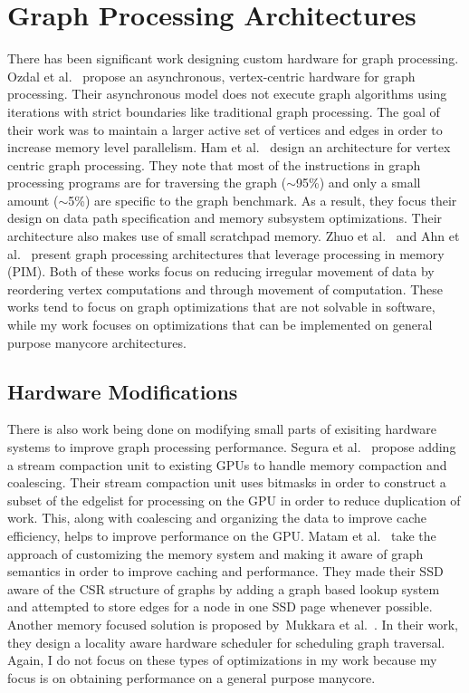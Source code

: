 \section{Graph Processing Architectures} There has been significant work designing custom hardware for graph processing.
Ozdal et al.~\cite{ozdal2016energy} propose an asynchronous, vertex-centric hardware for graph processing. 
Their asynchronous model does not execute graph algorithms using iterations with strict boundaries like traditional graph processing. 
The goal of their work was to maintain a larger active set of vertices and edges in order to increase memory level parallelism. 
Ham et al.~\cite{ham2016graphicionado} design an architecture for vertex centric graph processing. 
They note that most of the instructions in graph processing programs are for traversing the graph ($\sim$95\%) and only a small amount ($\sim$5\%) are specific to the graph benchmark. 
As a result, they focus their design on data path specification and memory subsystem optimizations.
Their architecture also makes use of small scratchpad memory.
Zhuo et al.~\cite{zhuo2019graphq} and Ahn et al.~\cite{ahn2016scalable} present graph processing architectures that leverage processing in memory (PIM).
Both of these works focus on reducing irregular movement of data by reordering vertex computations and through movement of computation.
These works tend to focus on graph optimizations that are not solvable in software, while my work focuses on optimizations that can be implemented on general purpose manycore architectures.

\subsection{Hardware Modifications} There is also work being done on modifying small parts of exisiting hardware systems to improve graph processing performance. 
Segura et al.~\cite{segura2019scu} propose adding a stream compaction unit to existing GPUs to handle memory compaction and coalescing.
Their stream compaction unit uses bitmasks in order to construct a subset of the edgelist for processing on the GPU in order to reduce duplication of work. 
This, along with coalescing and organizing the data to improve cache efficiency, helps to improve performance on the GPU.
Matam et al.~\cite{matam2019graphssd} take the approach of customizing the memory system and making it aware of graph semantics in order to improve caching and performance. 
They made their SSD aware of the CSR structure of graphs by adding a graph based lookup system and attempted to store edges for a node in one SSD page whenever possible.
Another memory focused solution is proposed by~Mukkara et al.~\cite{mukkara2018exploiting}.
In their work, they design a locality aware hardware scheduler for scheduling graph traversal.
Again, I do not focus on these types of optimizations in my work because my focus is on obtaining performance on a general purpose manycore.

